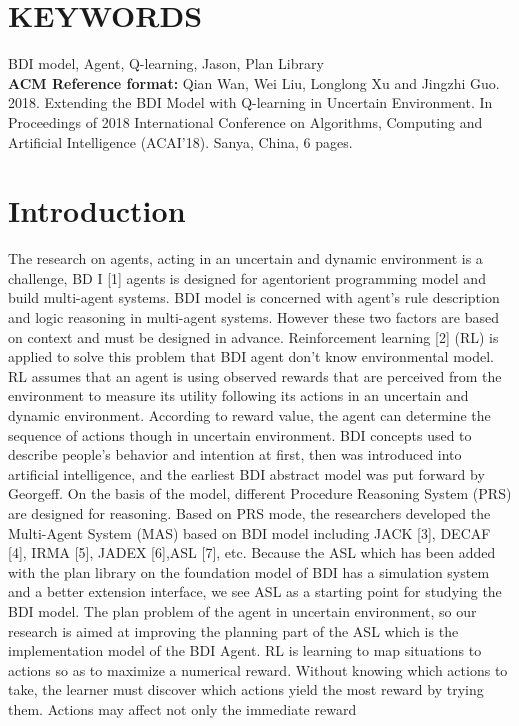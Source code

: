\documentclass{article}
\begin{document}
\section*{KEYWORDS}
BDI model, Agent, Q-learning, Jason, Plan Library\\
\textbf{ACM Reference format:}
Qian Wan, Wei Liu, Longlong Xu and Jingzhi Guo. 2018. Extending the
BDI Model with Q-learning in Uncertain Environment. In Proceedings of
2018 International Conference on Algorithms, Computing and Artificial
Intelligence (ACAI’18). Sanya, China, 6 pages.


\section{Introduction}
\label{agradecimientos}
The research on agents, acting in an uncertain and dynamic
environment is a challenge, BD I [1] agents is designed for agentorient programming model and build multi-agent systems. BDI
model is concerned with agent’s rule description and logic
reasoning in multi-agent systems. However these two factors are
based on context and must be designed in advance.
Reinforcement learning [2] (RL) is applied to solve this problem
that BDI agent don’t know environmental model. RL assumes
that an agent is using observed rewards that are perceived from
the environment to measure its utility following its actions in an
uncertain and dynamic environment. According to reward value,
the agent can determine the sequence of actions though in
uncertain environment.
BDI concepts used to describe people's behavior and intention
at first, then was introduced into artificial intelligence, and the
earliest BDI abstract model was put forward by Georgeff. On
the basis of the model, different Procedure Reasoning System
(PRS) are designed for reasoning. Based on PRS mode, the
researchers developed the Multi-Agent System (MAS) based on
BDI model including JACK [3], DECAF [4], IRMA [5],
JADEX [6],ASL [7], etc. Because the ASL which has been
added with the plan library on the foundation model of BDI has
a simulation system and a better extension interface, we see
ASL as a starting point for studying the BDI model. The plan
problem of the agent in uncertain environment, so our research
is aimed at improving the planning part of the ASL which is the
implementation model of the BDI Agent.
RL is learning to map situations to actions so as to maximize
a numerical reward. Without knowing which actions to take, the
learner must discover which actions yield the most reward by
trying them. Actions may affect not only the immediate reward
\end{document}
